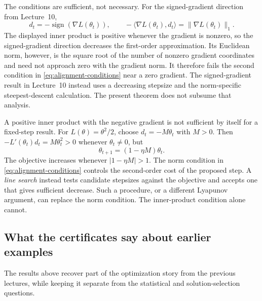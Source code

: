 \documentclass[11pt,twoside]{article}
\theoremstyle{definition}
\theoremstyle{remark}
\begin{document}
The conditions are sufficient, not necessary. For the signed-gradient
direction from Lecture~10,
\[
 d_t=-\operatorname{sign}(\nabla L(\theta_t)),
 \qquad
 -\langle\nabla L(\theta_t),d_t\rangle
 =\|\nabla L(\theta_t)\|_1.
\]
The displayed inner product is positive whenever the gradient is nonzero, so
the signed-gradient direction decreases the first-order approximation. Its
Euclidean norm, however, is the square root of the number of
nonzero gradient coordinates and need not approach zero with the gradient
norm. It therefore fails the second condition in
\cref{eq:alignment-conditions} near a zero gradient. The signed-gradient
result in Lecture~10 instead uses a decreasing stepsize and the
norm-specific steepest-descent calculation. The present theorem does not
subsume that analysis.

A positive inner product with the negative gradient is not sufficient by
itself for a fixed-step result. For $L(\theta)=\theta^2/2$, choose
$d_t=-M\theta_t$ with $M>0$. Then
$-L'(\theta_t)d_t=M\theta_t^2>0$ whenever $\theta_t\ne0$, but
\[
 \theta_{t+1}=(1-\eta M)\theta_t.
\]
The objective increases whenever $|1-\eta M|>1$. The norm condition in
\cref{eq:alignment-conditions} controls the second-order cost of the proposed
step. A \emph{line search} instead tests candidate stepsizes against the
objective and accepts one that gives sufficient decrease. Such a procedure, or
a different Lyapunov argument, can replace the norm condition. The
inner-product condition alone cannot.

\subsection{What the certificates say about earlier examples}

The results above recover part of the optimization story from the previous
lectures, while keeping it separate from the statistical and
solution-selection questions.
\end{document}
